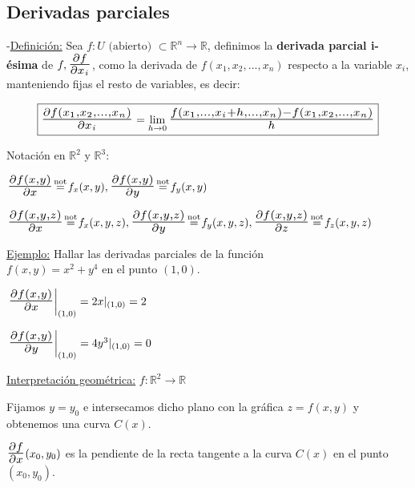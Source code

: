 \documentclass[10pt, titlepage]{article}
\newcommand{\eqc}[1]{\stackrel{\mathclap{\normalfont\mbox{\scriptsize{#1}}}}{=}}
\newcommand{\R}{\mathbb{R}}
\newcommand{\bfrac}[2]{\scalebox{1.4}{$\frac{#1}{#2}$}}
\newcommand{\definicion}{\noindent-\underline{Definición:} }
\newcommand{\dindent}{\indent\indent}
\begin{document}

\subsection{Derivadas parciales}
\vspace{5mm}

\definicion Sea $f : U \text{ (abierto) } \subset \R^n \to \R$, definimos la \textbf{derivada parcial i-ésima} de 
$f, \bfrac{\partial f}{\partial x_i}$, como la derivada de $f (x_1, x_2,..., x_n)$ respecto a la variable $x_i$, manteniendo fijas el resto de variables, es decir:

\[
\boxed{
\bfrac{\partial f (x_1, x_2,..., x_n)}{\partial x_i} = \displaystyle \lim_{h \to 0} \bfrac{f (x_1,..., x_i+h,...,x_n)  
- f (x_1, x_2,..., x_n)}{h}
}
\]
\vspace{5mm}

Notación en $\R^2$ y $\R^3$:
\vspace{3mm}

$\bfrac{\partial f (x, y)}{\partial x} \eqc{not} f_x (x, y), \bfrac{\partial f (x, y)}{\partial y} \eqc{not} f_y (x, y) 
$
\vspace{3mm}

$\bfrac{\partial f (x, y, z)}{\partial x} \eqc{not} f_x (x, y, z), \bfrac{\partial f (x, y, z)}{\partial y} \eqc{not} f_y (x, y, z) , \bfrac{\partial f (x, y, z)}{\partial z} \eqc{not} f_z (x, y, z)
$
\vspace{7mm}

\underline{Ejemplo:} Hallar las derivadas parciales de la función $f (x, y) = x^2 + y^4 \text{ en el punto } 
(1, 0)$.
\vspace{5mm}

\dindent $\left.\bfrac{\partial f(x, y)}{\partial x}\right |_{(1, 0)} = 2x |_{(1, 0)} = 2$
\vspace{3mm}

\dindent $\left.\bfrac{\partial f(x, y)}{\partial y}\right |_{(1, 0)} = 4y^3 |_{(1, 0)} = 0$
\vspace{7mm}

\noindent\underline{Interpretación geométrica:} $f : \R^2 \to \R$
\vspace{5mm}

Fijamos $y = y_0$ e intersecamos dicho plano con la gráfica $z = f (x, y)$ y obtenemos una curva $C (x)$.
\vspace{3mm}

$\bfrac{\partial f}{\partial x} (x_0, y_0)$ es la pendiente de la recta tangente a la curva $C (x)$ en el punto 
$(x_0, y_0)$.
\vspace{7mm}
\end{document}
